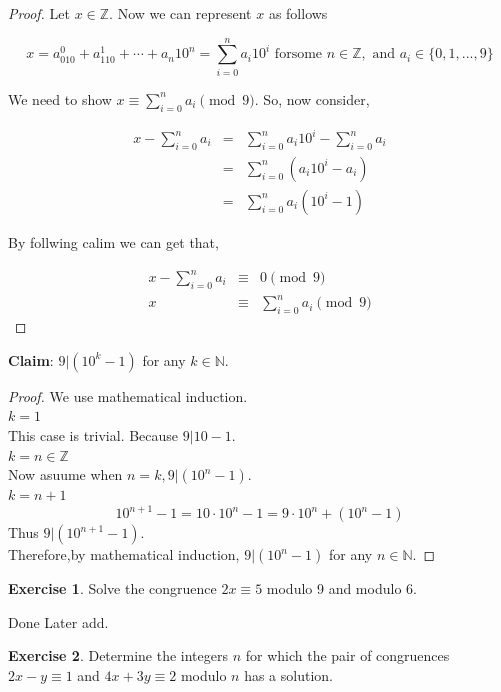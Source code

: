 \documentclass[
]{book}
\theoremstyle{definition}
\theoremstyle{definition}
\theoremstyle{definition}
\newtheorem{exercise}{Exercise}[chapter]
\theoremstyle{definition}
\theoremstyle{remark}
\begin{document}
\begin{proof}
Let \(x\in \mathbb{Z}\). Now we can represent \(x\) as follows

\[x=a_010^0+a_110^1+\cdots +a_n10^n=\sum_{i=0}^n a_{i}10^i\text{  forsome } n\in \mathbb{Z},\text{ and }a_i\in \{0,1,...,9\}\]

We need to show \(x \equiv \sum_{i=0}^na_i\pmod{9}\). So, now consider,

\begin{eqnarray}
x-\sum_{i=0}^n a_{i}&=&\sum_{i=0}^n a_{i}10^i-\sum_{i=0}^n a_{i}\\
&=& \sum_{i=0}^n (a_{i}10^i- a_{i})\\
&=& \sum_{i=0}^n a_{i}(10^i- 1)
\end{eqnarray}

By follwing calim we can get that,

\begin{eqnarray}
x-\sum_{i=0}^n a_i &\equiv & 0 \pmod{9}\\
x &\equiv & \sum_{i=0}^na_i\pmod{9}
\end{eqnarray}
\end{proof}

\textbf{Claim}: \(9|(10^k-1)\) for any \(k\in \mathbb{N}\).

\begin{proof}
We use mathematical induction.\\
\emph{\(k=1\)}\\
This case is trivial. Because \(9|10-1\).\\
\emph{\(k=n\in\mathbb{Z}\)}\\
Now asuume when \(n=k, 9|(10^n-1)\).\\
\emph{\(k=n+1\)}
\[10^{n+1}-1 =10\cdot 10^{n}-1=9\cdot 10^n + (10^n - 1) \]
Thus \(9\vert (10^{n+1}-1)\).\\
Therefore,by mathematical induction, \(9|(10^n-1)\) for any \(n\in \mathbb{N}\).
\end{proof}

\begin{exercise}
\protect\hypertarget{exr:unnamed-chunk-79}{}\label{exr:unnamed-chunk-79}Solve the congruence \(2x \equiv 5\) modulo 9 and modulo 6.
\end{exercise}

Done Later add.

\begin{exercise}
\protect\hypertarget{exr:unnamed-chunk-80}{}\label{exr:unnamed-chunk-80}Determine the integers \(n\) for which the pair of congruences \(2x - y \equiv 1\) and \(4x + 3y \equiv 2\) modulo \(n\) has a solution.
\end{exercise}
\end{document}
